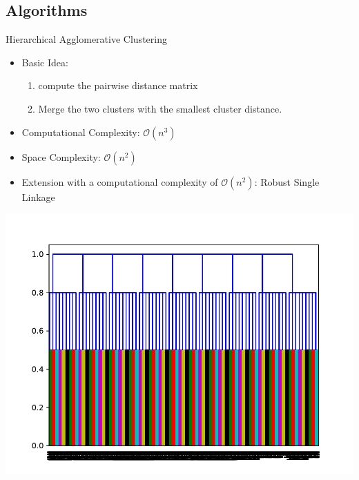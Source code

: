 \documentclass[rgb]{beamer}
\begin{document}
    \subsection{Algorithms}
        \begin{frame}{Hierarchical Agglomerative Clustering}
            \begin{multicols}{2}
                \begin{itemize}
                    \item  Basic Idea:
                    \begin{enumerate}
                        \item compute the pairwise distance matrix
                        \item Merge the two clusters with the smallest cluster distance.
                    \end{enumerate}
                    \item Computational Complexity: $\mathcal{O}(n^3)$            
                    \item Space Complexity: $\mathcal{O}(n^2)$
                    \item Extension with a computational complexity of $\mathcal{O}(n^2)$: Robust Single Linkage~\cite{Chaudhuri2010RatesOC}          
                \end{itemize}
                \vfill\null
                \columnbreak
                \includegraphics[keepaspectratio,width=\columnwidth, height=0.7\textheight]{img/linkage/synth_noise_0_dendro.pdf}
            \end{multicols}
        \end{frame}
        
\end{document}

